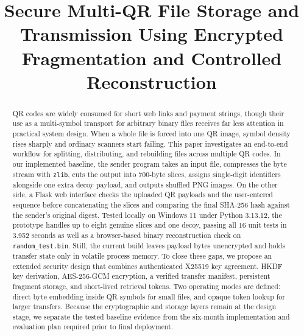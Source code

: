 \documentclass[conference]{IEEEtran}
\begin{document}
\title{Secure Multi-QR File Storage and Transmission Using Encrypted Fragmentation and Controlled Reconstruction}

\author{
}

\maketitle

\begin{abstract}
QR codes are widely consumed for short web links and payment strings, though their use as a multi-symbol transport for arbitrary binary files receives far less attention in practical system design. When a whole file is forced into one QR image, symbol density rises sharply and ordinary scanners start failing. This paper investigates an end-to-end workflow for splitting, distributing, and rebuilding files across multiple QR codes. In our implemented baseline, the sender program takes an input file, compresses the byte stream with \texttt{zlib}, cuts the output into 700-byte slices, assigns single-digit identifiers alongside one extra decoy payload, and outputs shuffled PNG images. On the other side, a Flask web interface checks the uploaded QR payloads and the user-entered sequence before concatenating the slices and comparing the final SHA-256 hash against the sender's original digest. Tested locally on Windows 11 under Python 3.13.12, the prototype handles up to eight genuine slices and one decoy, passing all 16 unit tests in 3.952 seconds as well as a browser-based binary reconstruction check on \texttt{random\_test.bin}. Still, the current build leaves payload bytes unencrypted and holds transfer state only in volatile process memory. To close these gaps, we propose an extended security design that combines authenticated X25519 key agreement, HKDF key derivation, AES-256-GCM encryption, a verified transfer manifest, persistent fragment storage, and short-lived retrieval tokens. Two operating modes are defined: direct byte embedding inside QR symbols for small files, and opaque token lookup for larger transfers. Because the cryptographic and storage layers remain at the design stage, we separate the tested baseline evidence from the six-month implementation and evaluation plan required prior to final deployment.
\end{abstract}
\end{document}
